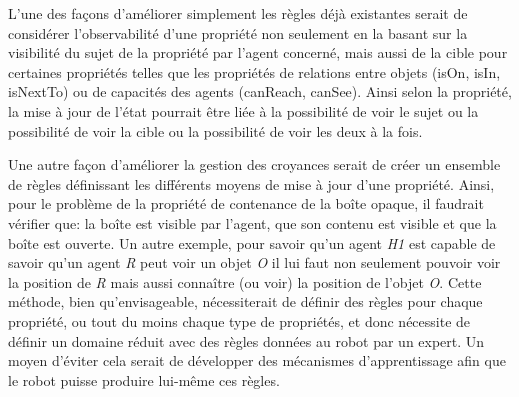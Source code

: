 \documentclass[a4paper,11pt,twoside]{StyleThese}
\begin{document}
L'une des façons d'améliorer simplement les règles déjà existantes serait de considérer l'observabilité d'une propriété non seulement en la basant sur la visibilité du sujet de la propriété par l'agent concerné, mais aussi de la cible pour certaines propriétés telles que les propriétés de relations entre objets (isOn, isIn, isNextTo) ou de capacités des agents (canReach, canSee). Ainsi selon la propriété, la mise à jour de l'état pourrait être liée à la possibilité de voir le sujet ou la possibilité de voir la cible ou la possibilité de voir les deux à la fois.

Une autre façon d'améliorer la gestion des croyances serait de créer un ensemble de règles définissant les différents moyens de mise à jour d'une propriété.
Ainsi, pour le problème de la propriété de contenance de la boîte opaque, il faudrait vérifier que: la boîte est visible par l'agent, que son contenu est visible et que la boîte est ouverte.
Un autre exemple, pour savoir qu'un agent \textit{H1} est capable de savoir qu'un agent \textit{R} peut voir un objet \textit{O} il lui faut non seulement pouvoir voir la position de \textit{R} mais aussi connaître (ou voir) la position de l'objet \textit{O}.
Cette méthode, bien qu'envisageable, nécessiterait de définir des règles pour chaque propriété, ou tout du moins chaque type de propriétés, et donc nécessite de définir un domaine réduit avec des règles données au robot par un expert.
Un moyen d'éviter cela serait de développer des mécanismes d'apprentissage afin que le robot puisse produire lui-même ces règles.





\end{document}
